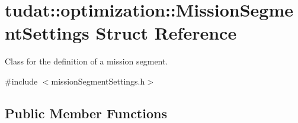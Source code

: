 \hypertarget{structtudat_1_1optimization_1_1MissionSegmentSettings}{}\section{tudat\+:\+:optimization\+:\+:Mission\+Segment\+Settings Struct Reference}
\label{structtudat_1_1optimization_1_1MissionSegmentSettings}


Class for the definition of a mission segment.  




{\ttfamily \#include $<$mission\+Segment\+Settings.\+h$>$}

\subsection*{Public Member Functions}
